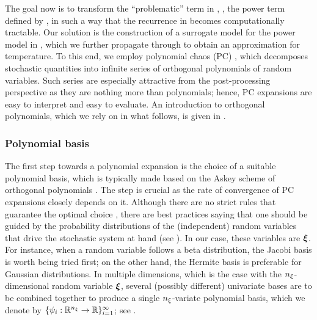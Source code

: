 The goal now is to transform the ``problematic'' term in , \ie, the power term defined by , in such a way that the recurrence in  becomes computationally tractable.
Our solution is the construction of a surrogate model for the power model in , which we further propagate through  to obtain an approximation for temperature.
To this end, we employ polynomial chaos (PC) \cite{xiu2010}, which decomposes stochastic quantities into infinite series of orthogonal polynomials of random variables.
Such series are especially attractive from the post-processing perspective as they are nothing more than polynomials; hence, PC expansions are easy to interpret and easy to evaluate.
An introduction to orthogonal polynomials, which we rely on in what follows, is given in .

\subsubsection{Polynomial basis} 
The first step towards a polynomial expansion is the choice of a suitable polynomial basis, which is typically made based on the Askey scheme of orthogonal polynomials \cite{xiu2010}.
The step is crucial as the rate of convergence of PC expansions closely depends on it.
Although there are no strict rules that guarantee the optimal choice \cite{knio2006}, there are best practices saying that one should be guided by the probability distributions of the (independent) random variables that drive the stochastic system at hand (see ).
In our case, these variables are $\boldsymbol{\xi}$.
For instance, when a random variable follows a beta distribution, the Jacobi basis is worth being tried first; on the other hand, the Hermite basis is preferable for Gaussian distributions.
In multiple dimensions, which is the case with the ${n_\xi}$-dimensional random variable $\boldsymbol{\xi}$, several (possibly different) univariate bases are to be combined together to produce a single ${n_\xi}$-variate polynomial basis, which we denote by $\{ \psi_i: \mathbb{R}^{n_\xi} \to \mathbb{R} \}_{i = 1}^\infty$; see \cite{xiu2010}.

